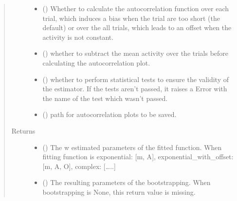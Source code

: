\documentclass[letterpaper,10pt,english]{sphinxmanual}
\begin{document}
\begin{fulllineitems}
\begin{quote}
\begin{description}
\begin{itemize}
\item {} 
 (\sphinxstyleliteralemphasis{\sphinxupquote{, }}\sphinxstyleliteralemphasis{\sphinxupquote{, }}) \textendash{} Whether to calculate the autocorrelation function over each trial, which induces a bias when the trial are too
short (the default) or over the all trials, which leads to an offset when the activity is not constant.

\item {} 
 (\sphinxstyleliteralemphasis{\sphinxupquote{, }}) \textendash{} whether to subtract the mean activity over the trials before calculating the autocorrelation plot.

\item {} 
 (\sphinxstyleliteralemphasis{\sphinxupquote{, }}) \textendash{} whether to perform statistical tests to ensure the validity of the estimator. If the tests aren’t passed, it
raises a Error with the name of the test which wasn’t passed.

\item {} 
 (\sphinxstyleliteralemphasis{\sphinxupquote{, }}) \textendash{} path for autocorrelation plots to be saved.

\end{itemize}

\item[{Returns}] \leavevmode
\begin{itemize}
\item {} 
 () \textendash{} The w estimated parameters of the fitted function. When fitting function is exponential: {[}m, A{]},
exponential\_with\_offset: {[}m, A, O{]}, complex: {[}…..{]}

\item {} 
 () \textendash{} The resulting parameters of the bootstrapping. When bootstrapping is None, this return value is missing.

\end{itemize}


\end{description}\end{quote}

\end{fulllineitems}
\end{document}
